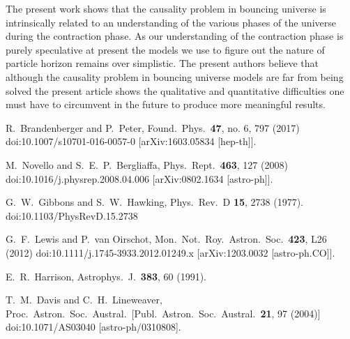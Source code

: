 \documentclass[24pt]{article}
\begin{document}
The present work shows that the causality problem in bouncing universe
is intrinsically related to an understanding of the various phases of
the universe during the contraction phase. As our understanding of the
contraction phase is purely speculative at present the models we use
to figure out the nature of particle horizon remains over
simplistic. The present authors believe that although the causality
problem in bouncing universe models are far from being solved the
present article shows the qualitative and quantitative difficulties
one must have to circumvent in the future to produce more meaningful 
results.
\begin{thebibliography}{999}

  R.~Brandenberger and P.~Peter,
  Found.\ Phys.\  {\bf 47}, no. 6, 797 (2017)
  doi:10.1007/s10701-016-0057-0
  [arXiv:1603.05834 [hep-th]].

  M.~Novello and S.~E.~P.~Bergliaffa,
  Phys.\ Rept.\  {\bf 463}, 127 (2008)
  doi:10.1016/j.physrep.2008.04.006
  [arXiv:0802.1634 [astro-ph]].

  G.~W.~Gibbons and S.~W.~Hawking,
  Phys.\ Rev.\ D {\bf 15}, 2738 (1977).
  doi:10.1103/PhysRevD.15.2738

  G.~F.~Lewis and P.~van Oirschot,
  Mon.\ Not.\ Roy.\ Astron.\ Soc.\  {\bf 423}, L26 (2012)
  doi:10.1111/j.1745-3933.2012.01249.x
  [arXiv:1203.0032 [astro-ph.CO]].

  E.~R.~Harrison,
  Astrophys.\ J.\  {\bf 383}, 60 (1991).  
  
  T.~M.~Davis and C.~H.~Lineweaver,
  Proc.\ Astron.\ Soc.\ Austral.\ 
  [Publ.\ Astron.\ Soc.\ Austral.\  {\bf 21}, 97 (2004)]
  doi:10.1071/AS03040
  [astro-ph/0310808].


\end{thebibliography}
\end{document}
